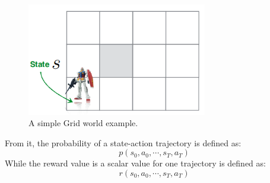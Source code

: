 \documentclass[11pt]{article}
\begin{document}
\begin{figure}[H]
\centering
    \includegraphics[width=0.7\textwidth]{2.png}
    \caption{A simple Grid world example.}
	\label{fig:1}
\end{figure}

From it, the probability of a state-action trajectory is defined as:
$$p\left(s_{0}, a_{0}, \cdots, s_{T}, a_{T}\right)$$
While the reward value is a scalar value for one trajectory is defined as:
$$r\left(s_{0}, a_{0}, \cdots, s_{T}, a_{T}\right)$$
\end{document}
